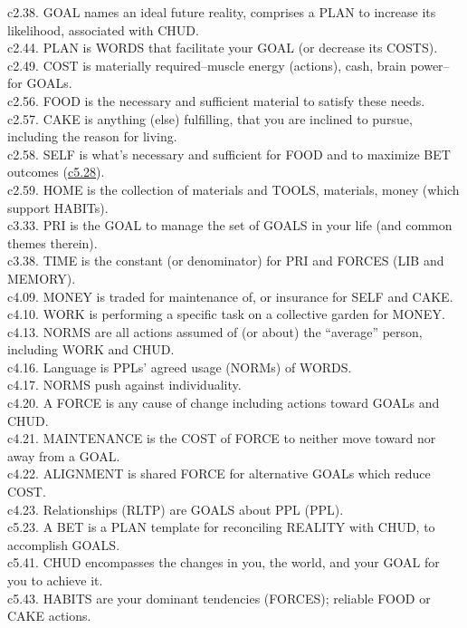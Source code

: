 \documentclass[
]{book}
\begin{document}
c2.38. GOAL names an ideal future reality, comprises a PLAN to increase its likelihood, associated with CHUD.\\
c2.44. PLAN is WORDS that facilitate your GOAL (or decrease its COSTS).\\
c2.49. COST is materially required--muscle energy (actions), cash, brain power-- for GOALs.\\
c2.56. FOOD is the necessary and sufficient material to satisfy these needs.\\
c2.57. CAKE is anything (else) fulfilling, that you are inclined to pursue, including the reason for living.\\
c2.58. SELF is what's necessary and sufficient for FOOD and to maximize BET outcomes (\protect\hyperlink{bet}{c5.28}).\\
c2.59. HOME is the collection of materials and TOOLS, materials, money (which support HABITs).\\
c3.33. PRI is the GOAL to manage the set of GOALS in your life (and common themes therein).\\
c3.38. TIME is the constant (or denominator) for PRI and FORCES (LIB and MEMORY).\\
c4.09. MONEY is traded for maintenance of, or insurance for SELF and CAKE.\\
c4.10. WORK is performing a specific task on a collective garden for MONEY.\\
c4.13. NORMS are all actions assumed of (or about) the ``average'' person, including WORK and CHUD.\\
c4.16. Language is PPLs' agreed usage (NORMs) of WORDS.\\
c4.17. NORMS push against individuality.\\
c4.20. A FORCE is any cause of change including actions toward GOALs and CHUD.\\
c4.21. MAINTENANCE is the COST of FORCE to neither move toward nor away from a GOAL.\\
c4.22. ALIGNMENT is shared FORCE for alternative GOALs which reduce COST.\\
c4.23. Relationships (RLTP) are GOALS about PPL (PPL).\\
c5.23. A BET is a PLAN template for reconciling REALITY with CHUD, to accomplish GOALS.\\
c5.41. CHUD encompasses the changes in you, the world, and your GOAL for you to achieve it.\\
c5.43. HABITS are your dominant tendencies (FORCES); reliable FOOD or CAKE actions.\\
\end{document}
